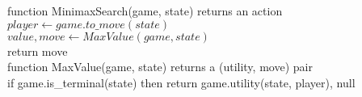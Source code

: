 \documentclass[preview]{standalone}
\begin{document}
\begin{center}
function MinimaxSearch(game, state) returns an action\\$player \gets game.to\_move(state)$\\$value, move \gets MaxValue(game, state)$\\return move\\function MaxValue(game, state) returns a (utility, move) pair\\if game.is\_terminal(state) then return game.utility(state, player), null
\end{center}
\end{document}
